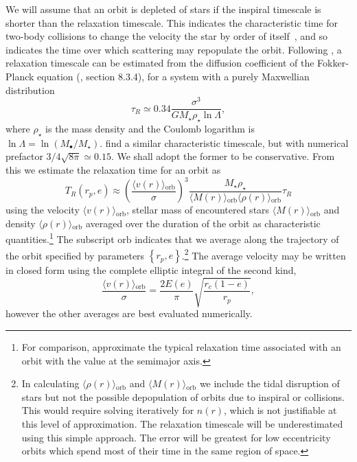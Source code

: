 \documentclass[useAMS,usedcolumn,usegraphicx,usenatbib]{mn2e}
\newcommand{\sub}[1]{\ensuremath{_\mathrm{#1}}}
\begin{document}
We will assume that an orbit is depleted of stars if the inspiral timescale is shorter than the relaxation timescale. This indicates the characteristic time for two-body collisions to change the velocity the star by order of itself~\citep{Binney1987}, and so indicates the time over which scattering may repopulate the orbit. Following \citep{Spitzer1971}, a relaxation timescale can be estimated from the diffusion coefficient of the Fokker-Planck equation (\citealt{Binney1987}, section 8.3.4), for a system with a purely Maxwellian distribution
\begin{equation}
\tau_R \simeq 0.34\frac{\sigma^3}{GM_\star\rho_\star\ln\Lambda},
\end{equation}
where $\rho_\star$ is the mass density and the Coulomb logarithm is $\ln\Lambda = \ln(M_\bullet/M_\star)$. \citet{Bahcall1977} find a similar characteristic timescale, but with numerical prefactor $3/4\sqrt{8\pi} \simeq 0.15$. We shall adopt the former to be conservative. From this we estimate the relaxation time for an orbit as
\begin{equation}
T_R(r_p,e) \approx \left(\frac{\langle v(r)\rangle\sub{orb}}{\sigma}\right)^3\frac{M_\star\rho_\star}{\langle M(r)\rangle\sub{orb}\langle \rho(r)\rangle\sub{orb}}\tau_R
\end{equation}
using the velocity $\langle v(r)\rangle\sub{orb}$, stellar mass of encountered stars $\langle M(r)\rangle\sub{orb}$ and density $\langle \rho(r)\rangle\sub{orb}$ averaged over the duration of the orbit as characteristic quantities.\footnote{For comparison, \citet{Hopman2005} approximate the typical relaxation time associated with an orbit with the value at the semimajor axis.} The subscript $\mathrm{orb}$ indicates that we average along the trajectory of the orbit specified by parameters $\left\{r_p,e\right\}$.\footnote{In calculating $\langle \rho(r)\rangle\sub{orb}$ and $\langle M(r)\rangle\sub{orb}$ we include the tidal disruption of stars but not the possible depopulation of orbits due to inspiral or collisions. This would require solving iteratively for $n(r)$, which is not justifiable at this level of approximation. The relaxation timescale will be underestimated using this simple approach. The error will be greatest for low eccentricity orbits which spend most of their time in the same region of space.} The average velocity may be written in closed form using the complete elliptic integral of the second kind,
\begin{equation}
\frac{\langle v(r)\rangle\sub{orb}}{\sigma} = \frac{2 E(e)}{\pi}\sqrt{\frac{r_c(1 - e)}{r_p}},
\end{equation}
however the other averages are best evaluated numerically.
\end{document}
